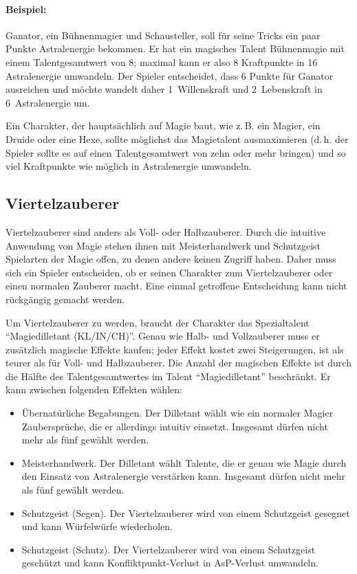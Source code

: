 \begin{beispiel}
\paragraph{Beispiel:} Ganator, ein Bühnenmagier und Schausteller, soll für seine Tricks ein paar Punkte Astralenergie bekommen. Er hat ein magisches Talent Bühnenmagie mit einem Talentgesamtwert von 8; maximal kann er also 8 Kraftpunkte in 16 Astralenergie umwandeln. Der Spieler entscheidet, dass 6 Punkte für Ganator ausreichen und möchte wandelt daher 1~Willenskraft und 2~Lebenskraft in 6~Astralenergie um.
\end{beispiel}

Ein Charakter, der hauptsächlich auf Magie baut, wie z.\,B. ein Magier, ein Druide oder eine Hexe, sollte möglichst das Magietalent ausmaximieren (d.\,h. der Spieler sollte es auf einen Talentgesamtwert von zehn oder mehr bringen) und so viel Kraftpunkte wie möglich in Astralenergie umwandeln.

\subsection{Viertelzauberer}
Viertelzauberer sind anders als Voll- oder Halbzauberer. Durch die intuitive Anwendung von Magie stehen ihnen mit Meisterhandwerk und Schutzgeist Spielarten der Magie offen, zu denen andere keinen Zugriff haben. Daher muss sich ein Spieler entscheiden, ob er seinen Charakter zum Viertelzauberer oder einen normalen Zauberer macht. Eine einmal getroffene Entscheidung kann nicht rückgängig gemacht werden.

Um Viertelzauberer zu werden, braucht der Charakter das Spezialtalent ``Magiedilletant (KL/IN/CH)''. Genau wie Halb- und Vollzauberer muss er zusätzlich magische Effekte kaufen; jeder Effekt kostet zwei Steigerungen, ist als teurer als für Voll- und Halbzauberer. Die Anzahl der magischen Effekte ist durch die Hälfte des Talentgesamtwertes im Talent ``Magiedilletant'' beschränkt. Er kann zwischen folgenden Effekten wählen:

\begin{itemize}
\item Übernatürliche Begabungen. Der Dilletant wählt wie ein normaler Magier Zaubersprüche, die er allerdings intuitiv einsetzt. Insgesamt dürfen nicht mehr als fünf gewählt werden.
\item Meisterhandwerk. Der Dilletant wählt Talente, die er genau wie Magie durch den Einsatz von Astralenergie verstärken kann. Insgesamt dürfen nicht mehr als fünf gewählt werden.
\item Schutzgeist (Segen). Der Viertelzauberer wird von einem Schutzgeist gesegnet und kann Würfelwürfe wiederholen.
\item Schutzgeist (Schutz). Der Viertelzauberer wird von einem Schutzgeist geschützt und kann Konfliktpunkt-Verlust in AsP-Verlust umwandeln.
\end{itemize}

